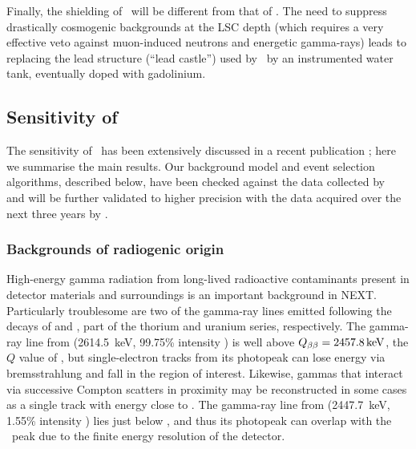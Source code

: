 Finally, the shielding of \NHD\ will be different from that of \Next. The need to suppress drastically cosmogenic backgrounds at the LSC depth (which requires a very effective veto against muon-induced neutrons and energetic gamma-rays) leads to replacing the lead structure (``lead castle'') used by \Next\ by an instrumented water tank, eventually doped with gadolinium.   


\subsection{Sensitivity of \NHD}
\label{sec:BackgroundsAtTheTonneScale}

The sensitivity of \NHD\ has been extensively discussed in a recent publication \cite{NEXT:2020amj}; here we summarise the main results. 
Our background model and event selection algorithms, described below, have been checked against the data collected by \NEW\ \cite{Novella:2019cne} and will be further validated to higher precision with the data acquired over the next three years by \Next. 

\subsubsection{Backgrounds of radiogenic origin}
High-energy gamma radiation from long-lived radioactive contaminants present in detector materials and surroundings is an important background in NEXT. Particularly troublesome are two of the gamma-ray lines emitted following the decays of  and , part of the thorium and uranium series, respectively. The gamma-ray line from  (2614.5~keV, 99.75\% intensity \cite{nudat}) is well above $\Qbb=\SI{2457.8}{\kilo\eV}$, the $Q$ value of , but single-electron tracks from its photopeak can lose energy via bremsstrahlung and fall in the region of interest. Likewise, gammas that interact via successive Compton scatters in proximity may be reconstructed in some cases as a single track with energy close to \Qbb. The gamma-ray line from  (2447.7~keV, 1.55\% intensity \cite{nudat}) lies just below \Qbb, and thus its photopeak can overlap with the \bbonu\ peak due to the finite energy resolution of the detector.


